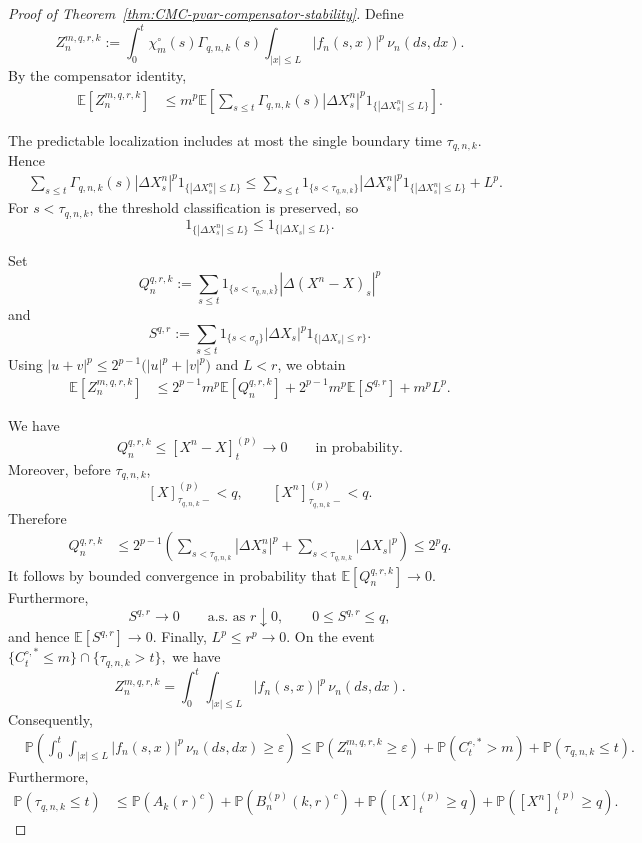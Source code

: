 \documentclass[a4paper,10pt]{article}
\newcommand{\E}{\mathbb E}
\renewcommand{\P}{\mathbb P}
\begin{document}
\begin{proof}[Proof of Theorem~\ref{thm:CMC-pvar-compensator-stability}]
Define
\[
Z_n^{m,q,r,k}
:=
\int_0^t
\chi_m^\circ(s)\Gamma_{q,n,k}(s)
\int_{|x|\le L}
|f_n(s,x)|^p\,\nu_n(ds,dx).
\]
By the compensator identity,
\begin{align}
\E[Z_n^{m,q,r,k}]
&\le
m^p
\E\left[
\sum_{s\le t}
\Gamma_{q,n,k}(s)
|\Delta X_s^n|^p
1_{\{|\Delta X_s^n|\le L\}}
\right].
\label{eq:pvar-stopped-small-first}
\end{align}

The predictable localization includes at most the single boundary time
\(\tau_{q,n,k}\). Hence
\[
\begin{aligned}
&\sum_{s\le t}
\Gamma_{q,n,k}(s)
|\Delta X_s^n|^p
1_{\{|\Delta X_s^n|\le L\}}
\le
\sum_{s\le t}
1_{\{s<\tau_{q,n,k}\}}
|\Delta X_s^n|^p
1_{\{|\Delta X_s^n|\le L\}}
+
L^p.
\end{aligned}
\]
For \(s<\tau_{q,n,k}\), the threshold classification is preserved,
so
\[
1_{\{|\Delta X_s^n|\le L\}}
\le
1_{\{|\Delta X_s|\le L\}}.
\]

Set
\[
Q_n^{q,r,k}
:=
\sum_{s\le t}
1_{\{s<\tau_{q,n,k}\}}
|\Delta(X^n-X)_s|^p
\]
and
\[
S^{q,r}
:=
\sum_{s\le t}
1_{\{s<\sigma_q\}}
|\Delta X_s|^p
1_{\{|\Delta X_s|\le r\}}.
\]
Using
$
|u+v|^p
\le
2^{p-1}\bigl(|u|^p+|v|^p\bigr)
$
and \(L<r\), we obtain
\begin{align}
\E[Z_n^{m,q,r,k}]
&\le
2^{p-1}m^p\E[Q_n^{q,r,k}]
+
2^{p-1}m^p\E[S^{q,r}]
+
m^pL^p.
\label{eq:pvar-stopped-small-estimate}
\end{align}

We have
\[
        Q_n^{q,r,k}
        \le
        [X^n-X]^{(p)}_t
        \longrightarrow0
        \qquad\text{in probability}.
\]
Moreover, before \(\tau_{q,n,k}\),
\[
[X]^{(p)}_{\tau_{q,n,k}-}<q,
\qquad
[X^n]^{(p)}_{\tau_{q,n,k}-}<q.
\]
Therefore
\[
\begin{aligned}
Q_n^{q,r,k}
&\le
2^{p-1}
\left(
\sum_{s<\tau_{q,n,k}}|\Delta X_s^n|^p
+
\sum_{s<\tau_{q,n,k}}|\Delta X_s|^p
\right)
\le
2^pq.
\end{aligned}
\]
It follows by bounded convergence in probability that
$
        \E[Q_n^{q,r,k}]\longrightarrow0.
$
Furthermore,
\[
        S^{q,r}\longrightarrow0
        \qquad\text{a.s. as }r\downarrow0,
        \qquad
        0\le S^{q,r}\le q,
\]
and hence
$
        \E[S^{q,r}]\longrightarrow0.
$
Finally,
$
        L^p\le r^p\longrightarrow0.
$
On the event
$
        \{C_t^{\circ,*}\le m\}
        \cap
        \{\tau_{q,n,k}>t\},
$
we have
\[
Z_n^{m,q,r,k}
=
\int_0^t
\int_{|x|\le L}
|f_n(s,x)|^p\,\nu_n(ds,dx).
\]
Consequently,
\begin{align}
&\P\left(
\int_0^t
\int_{|x|\le L}
|f_n(s,x)|^p\,\nu_n(ds,dx)
\ge\varepsilon
\right)
\le
\P(Z_n^{m,q,r,k}\ge\varepsilon)
+
\P(C_t^{\circ,*}>m)
+
\P(\tau_{q,n,k}\le t).
\label{eq:pvar-remove-small-localization}
\end{align}
Furthermore,
\begin{align}
\P(\tau_{q,n,k}\le t)
&\le
\P(A_k(r)^c)
+
\P(B_n^{(p)}(k,r)^c)
+
\P([X]^{(p)}_t\ge q)
+
\P([X^n]^{(p)}_t\ge q).
\label{eq:pvar-small-exit-bound}
\end{align}


\end{proof}
\end{document}
